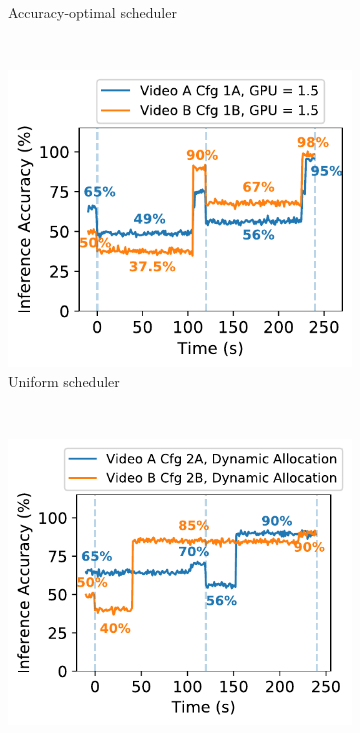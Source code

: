 \begin{figure}[t!]
\begin{subfigure}[t]{0.47\columnwidth}
    \caption{Accuracy-optimal scheduler}
    \label{fig:schedmot-res-prioritization}
  \end{subfigure}
      ~~\\
  \begin{subfigure}[t]{0.47\columnwidth}
    \centering
    \includegraphics[width=\linewidth]{ekya/figures/motivation/Scheduler/schedmot_multiwindow_eventual_best_cfgs.pdf}
    \caption{Uniform scheduler}
    \label{fig:schedmot-naive}
  \end{subfigure}  
  ~~
  \begin{subfigure}[t]{0.47\columnwidth}
    \centering
    \includegraphics[width=\linewidth]{ekya/figures/motivation/Scheduler/schedmot_multiwindow_prioritization_and_optimal_cfgs.pdf}

\end{subfigure}
\end{figure}
